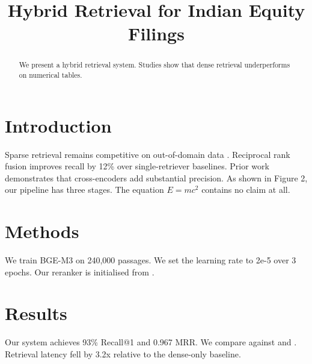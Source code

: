 \documentclass[11pt]{article}
\title{Hybrid Retrieval for Indian Equity Filings}
\begin{document}
\maketitle

\begin{abstract}
We present a hybrid retrieval system. Studies show that dense retrieval
underperforms on numerical tables.
\end{abstract}

\section{Introduction}
Sparse retrieval remains competitive on out-of-domain data \citep{thakur2021beir}.
Reciprocal rank fusion improves recall by 12\% over single-retriever baselines.
Prior work demonstrates that cross-encoders add substantial precision.
As shown in Figure 2, our pipeline has three stages.
The equation $E = mc^2$ contains no claim at all.

\section{Methods}
We train BGE-M3 \citep{chen2024bgem3} on 240,000 passages.
We set the learning rate to 2e-5 over 3 epochs.
Our reranker is initialised from \citet{nogueira2019passage}.

\section{Results}
Our system achieves 93\% Recall@1 and 0.967 MRR.
We compare against \citep{robertson2009bm25} and \cite{ghost2030nonexistent}.
Retrieval latency fell by 3.2x relative to the dense-only baseline.
\end{document}
